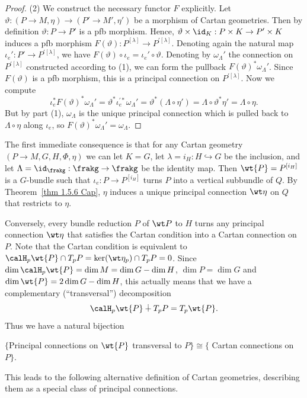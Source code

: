 \begin{proof}
    (2) We construct the necessary functor $F$ explicitly. Let $\vartheta:(P\to M,\eta)\to (P'\to M',\eta')$ be a morphism of Cartan geometries. Then by definition $\vartheta:P\to P'$ is a \gls{pfb} morphism. Hence, $\vartheta\times\id_K:P\times K\to P'\times K$ induces a \gls{pfb} morphism $F(\vartheta):P^{[\lambda]}\to P^{\prime[\lambda]}$. Denoting again the natural map $\iota_e':P'\to P^{\prime[\lambda]}$, we have $F(\vartheta)\circ\iota_e=\iota_e'\circ \vartheta$. Denoting by $\omega_\Lambda'$ the connection on $P^{\prime[\lambda]}$ constructed according to (1), we can form the pullback $F(\vartheta)^\ast \omega_\Lambda'$. Since $F(\vartheta)$ is a \gls{pfb} morphism, this is a principal connection on $P^{\prime[\lambda]}$. Now we compute 
    \[\iota_e^\ast F(\vartheta)^\ast\omega_\Lambda'=\vartheta^\ast\iota_e^{\prime\ast}\omega_\Lambda'=\vartheta^\ast(\Lambda\circ\eta')=\Lambda\circ\vartheta^\ast\eta'=\Lambda\circ\eta.\]
    But by part (1), $\omega_\Lambda$ is the unique principal connection which is pulled back to $\Lambda\circ\eta$ along $\iota_e$, so $F(\vartheta)^\ast \omega_\Lambda'=\omega_\Lambda$.
\end{proof}


The first immediate consequence is that for any Cartan geometry $(P\to M,G,H,\Phi,\eta)$ we can let $K=G$, let $\lambda=i_H:H\hookrightarrow G$ be the inclusion, and let $\Lambda=\id_\frakg:\frakg\to\frakg$ be the identity map. Then $\wt{P}=P^{[i_H]}$ is a $G$-bundle such that $\iota_e:P\to P^{[i_H]}$ turns $P$ into a vertical subbundle of $Q$. By Theorem~\ref{thm 1.5.6 Cap}, $\eta$ induces a unique principal connection $\wt\eta$ on $Q$ that restricts to $\eta$.

Conversely, every bundle reduction $P$ of $\wt P$ to $H$ turns any principal connection $\wt\eta$ that satisfies the Cartan condition into a Cartan connection on $P$. Note that the Cartan condition is equivalent to $\calH_p \wt{P}\cap T_p P=\ker(\wt\eta_p)\cap T_pP=0$. Since $\dim \calH_p \wt{P}=\dim M=\dim G-\dim H$, $\dim P=\dim G$ and $\dim \wt{P}=2\dim G-\dim H$, this actually means that we have a complementary (``transversal'') decomposition 
\[\calH_p \wt{P}\dotplus T_p P=T_p\wt{P}.\] Thus we have a natural bijection 
\begin{center}
    $\{$Principal connections on $\wt{P}$  transversal to $P\}\cong \{$ Cartan connections on $P\}$.
\end{center}
This leads to the following alternative definition of Cartan geometries, describing them as a special class of principal connections.

